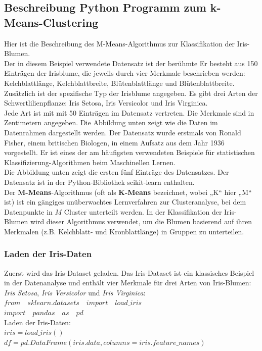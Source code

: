 \documentclass[12pt]{article}
\begin{document}
\subsection{Beschreibung Python Programm zum k-Means-Clustering}
%
Hier ist die Beschreibung des M-Means-Algorithmus zur Klassifikation der Iris-Blumen.\\
Der in diesem Beispiel verwendete Datensatz ist der berühmte {\color{blue}{IRIS-Blumen Datensatz}}  Er besteht aus 150 Einträgen der Irisblume, die jeweils durch vier Merkmale beschrieben werden: Kelchblattlänge, Kelchblattbreite, Blütenblattlänge und
Blütenblattbreite. \\[0.2cm]
Zusätzlich ist der spezifische Typ der Irisblume angegeben. Es gibt drei Arten der Schwertlilienpflanze: Iris Setosa, Iris Versicolor und Iris Virginica.\\
Jede Art ist mit mit 50 Einträgen im Datensatz vertreten. Die Merkmale sind in Zentimetern angegeben. Die Abbildung unten zeigt wie die Daten im Datenrahmen dargestellt werden. Der Datensatz wurde erstmals von Ronald Fisher, einem britischen Biologen, in einem Aufsatz aus dem Jahr 1936 vorgestellt. Er ist eines der am häufigsten verwendeten Beispiele für statistischen Klassifizierung-Algorithmen beim Maschinellen Lernen. \\
Die Abbildung unten zeigt die ersten fünf Einträge des Datensatzes. Der Datensatz ist in der Python-Bibliothek scikit-learn enthalten.\\ 
%
Der \textbf{M-Means}-Algorithmus (oft als \textbf{K-Means} bezeichnet, wobei „K“ hier „M“ ist) ist ein gängiges unüberwachtes Lernverfahren zur Clusteranalyse, bei dem Datenpunkte in \( M \) Cluster unterteilt werden. In der Klassifikation der Iris-Blumen wird dieser Algorithmus verwendet, um die Blumen basierend auf ihren Merkmalen (z.B. Kelchblatt- und Kronblattlänge) in Gruppen zu unterteilen.

\subsubsection{Laden der Iris-Daten}
%
Zuerst wird das Iris-Dataset geladen. Das Iris-Dataset ist ein klassisches Beispiel in der Datenanalyse und enthält vier Merkmale für drei Arten von Iris-Blumen: \textit{Iris Setosa}, \textit{Iris Versicolor} und \textit{Iris Virginica}: \\[0.2cm]
%
$ from\quad sklearn.datasets\quad import\quad load\_iris $ \\
$ import \quad pandas \quad as \quad pd $ \\[0.2cm]
%
Laden der Iris-Daten:\\[0.2cm]
$ iris = load\_iris()$ \\
$df = pd.DataFrame(iris.data, columns=iris.feature\_names)$ 
\end{document}

